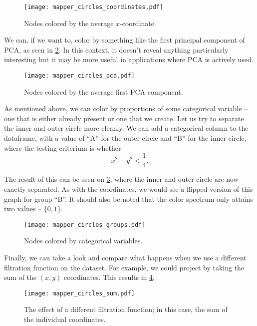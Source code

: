 \begin{figure}[h!]
  \centering
  \texttt{[image: mapper\_circles\_coordinates.pdf]}
  \caption{Nodes colored by the average $x$-coordinate.}
  \label{fig:mapper_circles_coordinates}
\end{figure}

We can, if we want to, color by something like the first principal component of PCA, as seen in \ref{fig:mapper_circles_pca}. In this context, it doesn't reveal anything particularly interesting but it may be more useful in applications where PCA is actively used.

\begin{figure}[h!]
  \centering
  \texttt{[image: mapper\_circles\_pca.pdf]}
  \caption{Nodes colored by the average first PCA component.}
  \label{fig:mapper_circles_pca}
\end{figure}

As mentioned above, we can color by proportions of some categorical variable -- one that is either already present or one that we create. Let us try to separate the inner and outer circle more cleanly. We can add a categorical column to the dataframe, with a value of ``A'' for the outer circle and ``B'' for the inner circle, where the testing criterium is whether
\begin{equation*}
  x^{2} + y^{2} < \frac{1}{4}.
\end{equation*}

The result of this can be seen on \ref{fig:mapper_circles_groups}, where the inner and outer circle are now exactly separated. As with the coordinates, we would see a flipped version of this graph for group ``B''. It should also be noted that the color spectrum only attains two values -- $\{0, 1\}$.

\begin{figure}[h!]
  \centering
  \texttt{[image: mapper\_circles\_groups.pdf]}
  \caption{Nodes colored by categorical variables.}
  \label{fig:mapper_circles_groups}
\end{figure}

Finally, we can take a look and compare what happens when we use a different filtration function on the dataset. For example, we could project by taking the sum of the $(x,y)$ coordinates. This results in \ref{fig:mapper_circles_sum}.

\begin{figure}[h!]
  \centering
  \texttt{[image: mapper\_circles\_sum.pdf]}
  \caption{The effect of a different filtration function; in this case, the sum of the individual coordinates.}
  \label{fig:mapper_circles_sum}
\end{figure}

